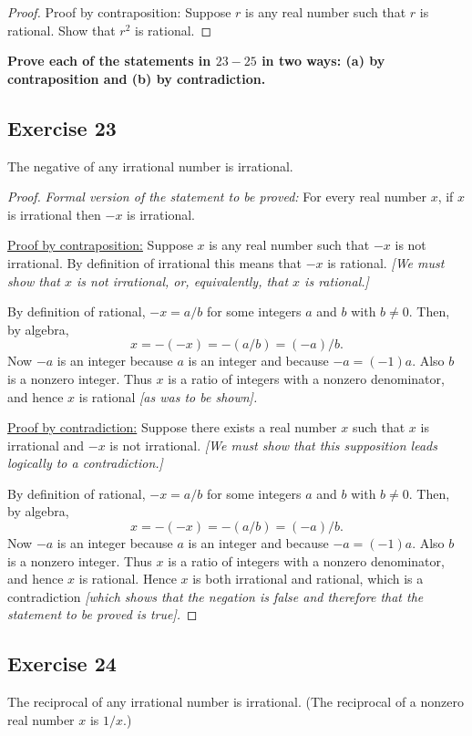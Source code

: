 \documentclass[14pt]{extarticle}
\newcommand{\cy}{\color{cyan}}
\begin{document}
\begin{proof}
Proof by contraposition: Suppose $r$ is any real number such that $r$ is rational. Show that $r^2$ is rational.
\end{proof}

{\bf \cy Prove each of the statements in $23-25$ in two ways: (a) by contraposition and (b) by contradiction.}

\subsection{Exercise 23}
The negative of any irrational number is irrational.

\begin{proof}
{\it Formal version of the statement to be proved:} For every real number $x$, if $x$ is irrational then $-x$ is irrational.

\underline{Proof by contraposition:} Suppose $x$ is any real number such that $-x$ is not irrational. By definition of irrational this means that $-x$ is rational. {\it [We must show that $x$ is not irrational, or, equivalently, that $x$ is rational.]} 

By definition of rational, $-x = a/b$ for some integers $a$ and $b$ with $b \neq 0$. Then, by algebra,
\[
x = -(-x) = -(a/b) = (-a)/b.
\]
Now $-a$ is an integer because $a$ is an integer and because $-a = (-1)a$. Also $b$ is a nonzero integer. Thus $x$ is a ratio of integers with a nonzero denominator, and hence $x$ is rational {\it [as was to be shown].}

\underline{Proof by contradiction:} Suppose there exists a real number $x$ such that $x$ is irrational and $-x$ is not irrational. {\it [We must show that this supposition leads logically to a contradiction.]} 

By definition of rational, $-x = a/b$ for some integers $a$ and $b$ with $b \neq 0$. Then, by algebra,
\[
x = -(-x) = -(a/b) = (-a)/b.
\]
Now $-a$ is an integer because $a$ is an integer and because $-a = (-1)a$. Also $b$ is a nonzero integer. Thus $x$ is a ratio of integers with a nonzero denominator, and hence $x$ is rational. Hence $x$ is both irrational and rational, which is a contradiction {\it [which shows that the negation is false and therefore that the statement to be proved is true].}
\end{proof}

\subsection{Exercise 24}
The reciprocal of any irrational number is irrational. (The reciprocal of a nonzero real number $x$ is $1/x$.)
\end{document}
